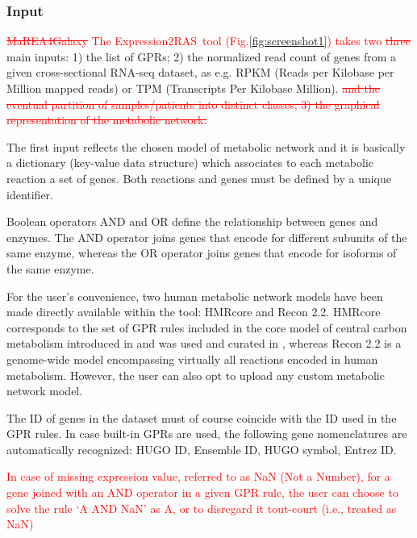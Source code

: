 \documentclass[preprint,12pt,authoryear]{elsarticle}
\newcommand{\red}{\textcolor{red}}
\newcommand{\mareagalaxy}{\textsf{MaREA4Galaxy}}
\newcommand{\RASTool}{\textsf{Expression2RAS}}
\begin{document}
\subsubsection{Input} 
\red{\sout{\mareagalaxy} The \RASTool\ tool (Fig.\ref{fig:screenshot1}) takes two \sout{three}} main inputs: 1) the list of GPRs; 2) the normalized read count of genes from a given cross-sectional RNA-seq dataset, as e.g. RPKM (Reads per Kilobase per Million mapped reads) or TPM (Transcripts Per Kilobase Million). \red{\sout{and the eventual partition of samples/patients into distinct classes; 3) the graphical representation of the metabolic network.}}

The first input reflects the chosen model of metabolic network and it is basically a dictionary (key-value data structure) which associates to each metabolic reaction a set of genes. Both reactions and genes must be defined by a unique identifier.

Boolean operators AND and OR define the relationship between genes and enzymes.  
The AND operator joins genes that encode for different subunits of the same enzyme, whereas the OR operator joins genes that encode for isoforms of the same enzyme.

For the user's convenience, two human metabolic network models have been made directly available within the tool: HMRcore and Recon 2.2. HMRcore corresponds to the set of GPR rules included in the core model of central carbon metabolism introduced in \citep{DiFilippo2016} and was used and curated in \citep{popFBA,graudenzi2018fbaca,damiani2018integration,marea}, whereas Recon 2.2 \citep{swainston2016recon} is a genome-wide model encompassing virtually all reactions encoded in human metabolism.
However, the user can also opt to upload any custom metabolic network model.

The ID of genes in the dataset must of course coincide with the ID used in the GPR rules. In case built-in GPRs are used, the following gene nomenclatures are automatically recognized: HUGO ID, Ensemble ID, HUGO symbol, Entrez ID. 

\red{In case of missing expression value, referred to as NaN (Not a Number), for a gene joined with an AND operator in a given GPR rule, the user can choose to solve the rule `A AND NaN' as A, or to disregard it tout-court (i.e., treated as NaN)}
\end{document}
